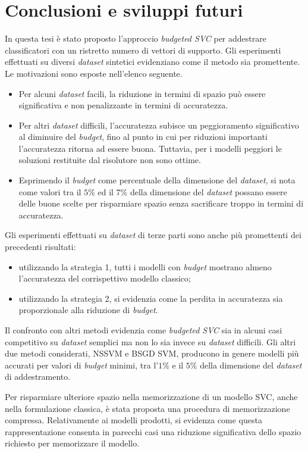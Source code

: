 \chapter{Conclusioni e sviluppi futuri}
\label{chap:conclusioni}
In questa tesi è stato proposto l'approccio \emph{budgeted SVC} per addestrare classificatori con un ristretto numero di vettori di supporto.
Gli esperimenti effettuati su diversi \emph{dataset} sintetici evidenziano come il metodo sia promettente. 
Le motivazioni sono esposte nell'elenco seguente.
\begin{itemize}
    \item Per alcuni \emph{dataset} facili, la riduzione in termini di spazio può essere significativa e non penalizzante in termini di accuratezza.
    \item Per altri \emph{dataset} difficili, l'accuratezza subisce un peggioramento significativo al diminuire del \emph{budget}, fino al punto in cui per riduzioni importanti l'accuratezza ritorna ad essere buona. Tuttavia, per i modelli peggiori le soluzioni restituite dal risolutore non sono ottime.
    \item Esprimendo il \emph{budget} come percentuale della dimensione del \emph{dataset}, si nota come valori tra il $5\%$ ed il $7\%$ della dimensione del \emph{dataset} possano essere delle buone scelte per risparmiare spazio senza sacrificare troppo in termini di accuratezza.
\end{itemize}

Gli esperimenti effettuati su \emph{dataset} di terze parti sono anche più promettenti dei precedenti risultati:
\begin{itemize}
    \item utilizzando la strategia 1, tutti i modelli con \emph{budget} mostrano almeno l'accuratezza del corrispettivo modello classico;
    \item utilizzando la strategia 2, si evidenzia come la perdita in accuratezza sia proporzionale alla riduzione di \emph{budget}.
\end{itemize}

Il confronto con altri metodi evidenzia come \emph{budgeted SVC} sia in alcuni casi competitivo su \emph{dataset} semplici ma non lo sia invece su \emph{dataset} difficili.
Gli altri due metodi considerati, NSSVM e BSGD SVM,  producono in genere modelli più accurati per valori di \emph{budget} minimi, tra l'$1\%$ e il $5\%$ della dimensione del \emph{dataset} di addestramento.

Per risparmiare ulteriore spazio nella memorizzazione di un modello SVC, anche nella formulazione classica, è stata proposta una procedura di memorizzazione compressa.
Relativamente ai modelli prodotti, si evidenza come questa rappresentazione consenta in parecchi casi una riduzione significativa dello spazio richiesto per memorizzare il modello.

